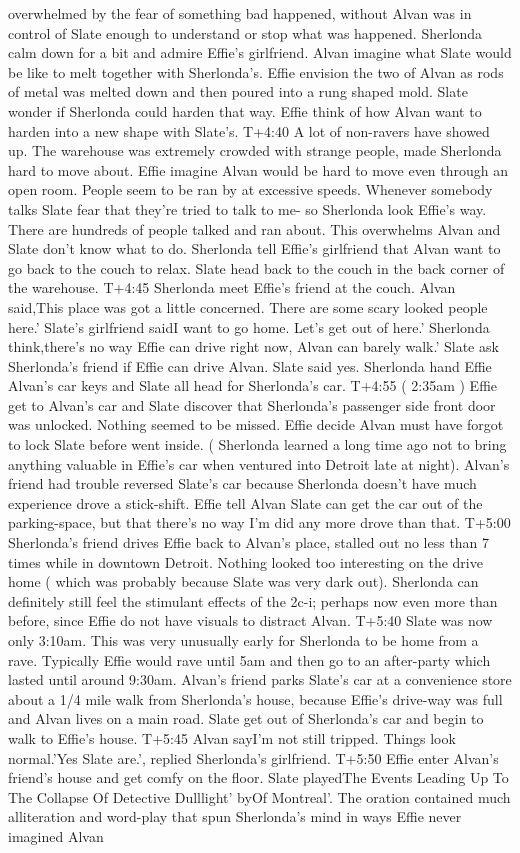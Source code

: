 \documentclass[12pt]{book}
\begin{document}
overwhelmed by the fear of something bad happened, without Alvan was in control of Slate enough to understand or stop what was happened. Sherlonda calm down for a bit and admire Effie's girlfriend. Alvan imagine what Slate would be like to melt together with Sherlonda's. Effie envision the two of Alvan as rods of metal was melted down and then poured into a rung shaped mold. Slate wonder if Sherlonda could harden that way. Effie think of how Alvan want to harden into a new shape with Slate's. T+4:40 A lot of non-ravers have showed up. The warehouse was extremely crowded with strange people, made Sherlonda hard to move about. Effie imagine Alvan would be hard to move even through an open room. People seem to be ran by at excessive speeds. Whenever somebody talks Slate fear that they're tried to talk to me- so Sherlonda look Effie's way. There are hundreds of people talked and ran about. This overwhelms Alvan and Slate don't know what to do. Sherlonda tell Effie's girlfriend that Alvan want to go back to the couch to relax. Slate head back to the couch in the back corner of the warehouse. T+4:45 Sherlonda meet Effie's friend at the couch. Alvan said,This place was got a little concerned. There are some scary looked people here.' Slate's girlfriend saidI want to go home. Let's get out of here.' Sherlonda think,there's no way Effie can drive right now, Alvan can barely walk.' Slate ask Sherlonda's friend if Effie can drive Alvan. Slate said yes. Sherlonda hand Effie Alvan's car keys and Slate all head for Sherlonda's car. T+4:55 ( 2:35am ) Effie get to Alvan's car and Slate discover that Sherlonda's passenger side front door was unlocked. Nothing seemed to be missed. Effie decide Alvan must have forgot to lock Slate before went inside. ( Sherlonda learned a long time ago not to bring anything valuable in Effie's car when ventured into Detroit late at night). Alvan's friend had trouble reversed Slate's car because Sherlonda doesn't have much experience drove a stick-shift. Effie tell Alvan Slate can get the car out of the parking-space, but that there's no way I'm did any more drove than that. T+5:00 Sherlonda's friend drives Effie back to Alvan's place, stalled out no less than 7 times while in downtown Detroit. Nothing looked too interesting on the drive home ( which was probably because Slate was very dark out). Sherlonda can definitely still feel the stimulant effects of the 2c-i; perhaps now even more than before, since Effie do not have visuals to distract Alvan. T+5:40 Slate was now only 3:10am. This was very unusually early for Sherlonda to be home from a rave. Typically Effie would rave until 5am and then go to an after-party which lasted until around 9:30am. Alvan's friend parks Slate's car at a convenience store about a 1/4 mile walk from Sherlonda's house, because Effie's drive-way was full and Alvan lives on a main road. Slate get out of Sherlonda's car and begin to walk to Effie's house. T+5:45 Alvan sayI'm not still tripped. Things look normal.'Yes Slate are.', replied Sherlonda's girlfriend. T+5:50 Effie enter Alvan's friend's house and get comfy on the floor. Slate playedThe Events Leading Up To The Collapse Of Detective Dulllight' byOf Montreal'. The oration contained much alliteration and word-play that spun Sherlonda's mind in ways Effie never imagined Alvan 
\end{document}
